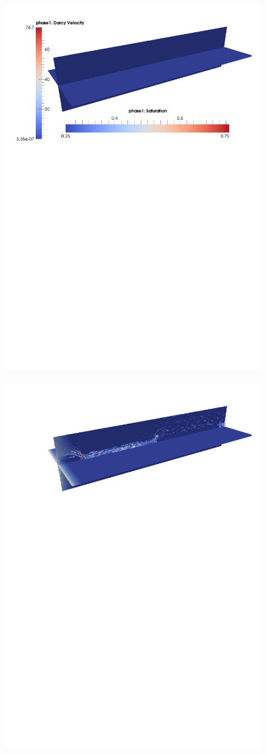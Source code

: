   \begin{figure}[ht] 
    \vbox{\vspace{0.cm}
        \hbox{\hspace{-3.cm}
            \includegraphics[width=.75\textwidth]{./Pics1/3D_ChannelAdaptive/Test_SlowNewAdapt_0_ContourPlotSlice_b} \hspace{-.5cm}
            \includegraphics[width=.70\textwidth]{./Pics1/3D_ChannelAdaptive/Test_SlowNewAdapt_20_ContourPlotSlice_b}}
}
\end{figure}
